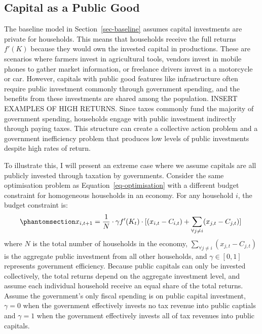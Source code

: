 \documentclass[
  11pt]{article}
\begin{document}
\subsection{Capital as a Public Good}\label{sec-capital-public}

The baseline model in Section~\ref{sec-baseline} assumes capital
investments are private for households. This means that households
receive the full returns \(f'(K)\) because they would own the invested
capital in productions. These are scenarios where farmers invest in
agricultural tools, vendors invest in mobile phones to gather market
information, or freelance drivers invest in a motorcycle or car.
However, capitals with public good features like infrastructure often
require public investment commonly through government spending, and the
benefits from these investments are shared among the population. INSERT
EXAMPLES OF HIGH RETURNS. Since taxes commonly fund the majority of
government spending, households engage with public investment indirectly
through paying taxes. This structure can create a collective action
problem and a government inefficiency problem that produces low levels
of public investments despite high rates of return.

To illustrate this, I will present an extreme case where we assume
capitals are all publicly invested through taxation by governments.
Consider the same optimisation problem as Equation~\ref{eq-optimisation}
with a different budget constraint for homogeneous households in an
economy. For any household \(i\), the budget constraint is:
\begin{equation}\phantomsection\label{eq-budget-public}{
x_{i,t+1} = \frac{1}{N} \cdot \gamma f'(K_t) \cdot [(x_{i,t} - C_{i,t}) + \sum_{\forall j \neq i} (x_{j,t} - C_{j, t})]\
}\end{equation} where \(N\) is the total number of households in the
economy, \(\sum_{\forall j \neq i} (x_{j,t} - C_{j, t})\) is the
aggregate public investment from all other households, and
\(\gamma \in [0,1]\) represents government efficiency. Because public
capitals can only be invested collectively, the total returns depend on
the aggregate investment level, and assume each individual household
receive an equal share of the total returns. Assume the government's
only fiscal spending is on public capital investment, \(\gamma=0\) when
the government effectively invests no tax revenue into public captials
and \(\gamma = 1\) when the government effectively invests all of tax
revenues into public capitals.
\end{document}
